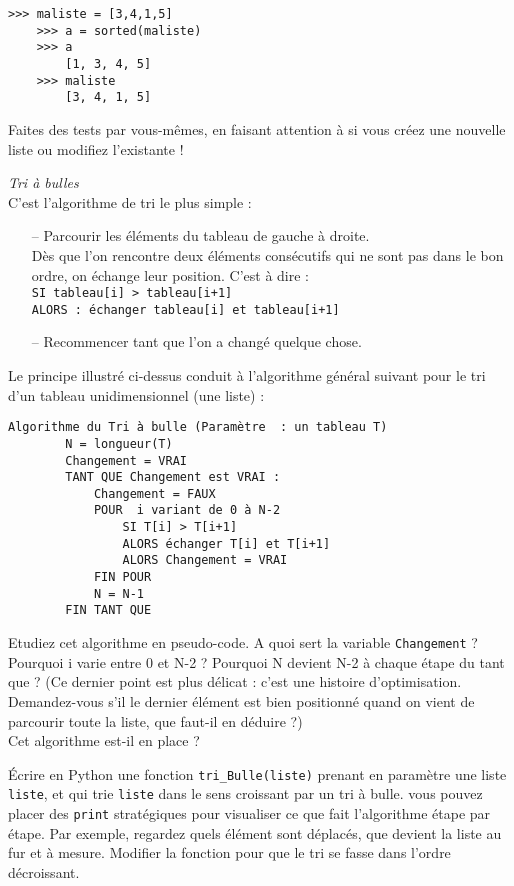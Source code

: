 \begin{Verbatim}[tabsize=4]
	>>> maliste = [3,4,1,5]
	>>> a = sorted(maliste)
	>>> a
		[1, 3, 4, 5]
	>>> maliste
		[3, 4, 1, 5]
\end{Verbatim}

\ques Faites des tests par vous-mêmes, en faisant attention à si vous créez une nouvelle liste ou modifiez l'existante !

\newpage
\textit{Tri à bulles}\\
C'est l'algorithme de tri le plus simple :
\begin{enumerate}
	\item [--] Parcourir les éléments du tableau de gauche à droite. \\

	      Dès que l'on rencontre deux éléments consécutifs qui ne sont pas dans le bon ordre, on échange leur position.
	      C'est à dire :\\
	      \texttt{SI tableau[i] > tableau[i+1]}\\
	      \texttt{ALORS : échanger tableau[i] et tableau[i+1]}

	\item[--] Recommencer tant que l'on a changé quelque chose.
\end{enumerate}

Le principe illustré ci-dessus conduit à l'algorithme général suivant pour le tri d'un tableau unidimensionnel (une liste) :
\begin{Verbatim}[tabsize=4]
	Algorithme du Tri à bulle (Paramètre  : un tableau T)
        N = longueur(T)
        Changement = VRAI
        TANT QUE Changement est VRAI :
            Changement = FAUX
            POUR  i variant de 0 à N-2
                SI T[i] > T[i+1]
                ALORS échanger T[i] et T[i+1]
                ALORS Changement = VRAI
            FIN POUR
            N = N-1
        FIN TANT QUE
\end{Verbatim}

\ques Etudiez cet algorithme en pseudo-code. A quoi sert la variable \texttt{Changement} ? Pourquoi i varie entre 0 et N-2 ? Pourquoi N devient N-2 à chaque étape du tant que ? (Ce dernier point est plus délicat : c'est une histoire d'optimisation. Demandez-vous s'il le dernier élément est bien positionné quand on vient de parcourir toute la liste, que faut-il en déduire ?) \\
Cet algorithme est-il en place ?

\quessques Écrire en Python une fonction \texttt{tri\_Bulle(liste)} prenant en paramètre une liste \texttt{liste}, et qui trie \texttt{liste} dans le sens croissant par un tri à bulle.
 vous pouvez placer des \texttt{print} stratégiques pour visualiser ce que fait l'algorithme étape par étape. Par exemple, regardez quels élément sont déplacés, que devient la liste au fur et à mesure.
\ssques Modifier la fonction pour que le tri se fasse dans l'ordre décroissant.

